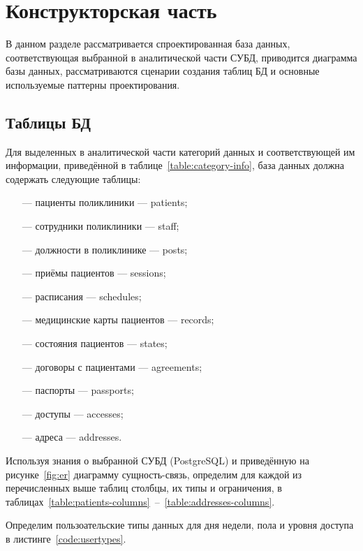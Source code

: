 \section{Конструкторская часть}

В  данном  разделе  рассматривается спроектированная база данных, соответствующая выбранной в  аналитической части СУБД, приводится диаграмма базы данных, рассматриваются сценарии создания таблиц БД и основные используемые паттерны проектирования.

\subsection{Таблицы БД}

Для выделенных в аналитической части категорий данных и соответствующей им информации, приведённой в таблице~\ref{table:category-info}, база данных должна содержать следующие таблицы:

\begin{itemize}[leftmargin=1.6\parindent]
	\item[---] пациенты поликлиники --- patients;
	\item[---] сотрудники поликлиники --- staff;
	\item[---] должности в поликлинике --- posts;
	\item[---] приёмы пациентов --- sessions;
	\item[---] расписания --- schedules;
	\item[---] медицинские карты пациентов --- records;
	\item[---] состояния пациентов --- states;
	\item[---] договоры с пациентами --- agreements;
	\item[---] паспорты --- passports;
	\item[---] доступы --- accesses;
	\item[---] адреса --- addresses.
\end{itemize}

Используя знания о выбранной СУБД (PostgreSQL) и приведённую на рисунке~\ref{fig:er} диаграмму сущность-связь, определим для каждой из перечисленных выше таблиц столбцы, их типы и ограничения, в таблицах~\ref{table:patients-columns}~--~\ref{table:addresses-columns}.

Определим пользоательские типы данных для дня недели, пола и уровня доступа в листинге~\ref{code:usertypes}.



